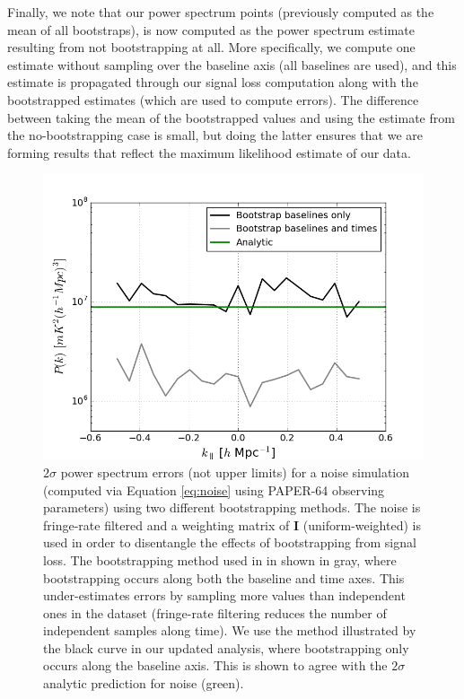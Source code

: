 \documentclass[preprint2,numberedappendix,tighten]{aastex6}  %
\begin{document}
Finally, we note that our power spectrum points (previously computed as the mean of all bootstraps), is now computed as the power spectrum estimate resulting from not bootstrapping at all. More specifically, we compute one estimate without sampling over the baseline axis (all baselines are used), and this estimate is propagated through our signal loss computation along with the bootstrapped estimates (which are used to compute errors). The difference between taking the mean of the bootstrapped values and using the estimate from the no-bootstrapping case is small, but doing the latter ensures that we are forming results that reflect the maximum likelihood estimate of our data.

\begin{figure}
	\centering
	\includegraphics[trim={0.3cm 0cm 0.3cm 0.3cm},width=\columnwidth]{plots/noise_errors.png}
	\caption{$2\sigma$ power spectrum errors (not upper limits) for a noise simulation (computed via Equation \eqref{eq:noise} using PAPER-64 observing parameters) using two different bootstrapping 
methods. The noise is fringe-rate filtered and a weighting matrix of $\textbf{I}$ (uniform-weighted) is used in order to disentangle the 
effects of bootstrapping from signal loss. The bootstrapping method used in  in shown in gray, where bootstrapping occurs along both the baseline and time axes. This under-estimates errors by sampling more values than independent ones in the dataset (fringe-rate filtering reduces the number of independent samples along time). We use the method illustrated by the black curve in our updated analysis, where bootstrapping only occurs along the baseline axis. This is shown to agree with the $2\sigma$ analytic prediction for noise (green).}
	\label{fig:data_errors}
\end{figure}
\end{document}
